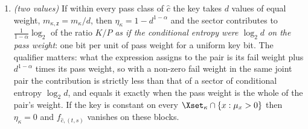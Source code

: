 \begin{lemma}
\begin{enumerate}[label=(\roman*),leftmargin=2.2em]
 $\mu_x=\tr N^{(t)}_x/p_t$ and $p_t=\tr\tau^{(t)}_A$, declared
numbers.
\item \emph{(two values)} If within every pass class of $\hat c$ the key
takes $d$ values of equal weight, $m_{\kappa,\mathsf z}=m_{\kappa}/d$, then
$\eta_{\kappa}=1-d^{1-\alpha}$ and the sector contributes to
$\frac{1}{1-\alpha}\log_2$ of the ratio $K/P$ \emph{as if the conditional
entropy were $\log_2d$ on the pass weight}: one bit per unit of pass weight
for a uniform key bit. The qualifier matters: what the
expression assigns to the pair is its fail weight plus $d^{1-\alpha}$ times
its pass weight, so with a non-zero fail weight in the same joint pair the
contribution is strictly less than that of a sector of conditional entropy
$\log_2d$, and equals it exactly when the pass weight is the whole of the
pair's weight. If the key is
constant on every $\Xset_{\kappa}\cap\{x:\mu_x>0\}$ then $\eta_{\kappa}=0$
and $f_{\hat c,(t,s)}$ vanishes on these blocks.
\end{enumerate}
\end{lemma}

